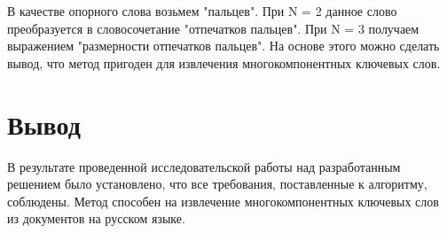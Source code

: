В качестве опорного слова возьмем "пальцев". При N = 2 данное слово преобразуется в словосочетание "отпечатков пальцев". При N = 3 получаем выражением "размерности отпечатков пальцев". На основе этого можно сделать вывод, что метод пригоден для извлечения многокомпонентных ключевых слов.

\section{Вывод}
В результате проведенной исследовательской работы над разработанным решением было установлено, что все требования, поставленные к алгоритму, соблюдены.
Метод способен на извлечение многокомпонентных ключевых слов из документов на русском языке. 
